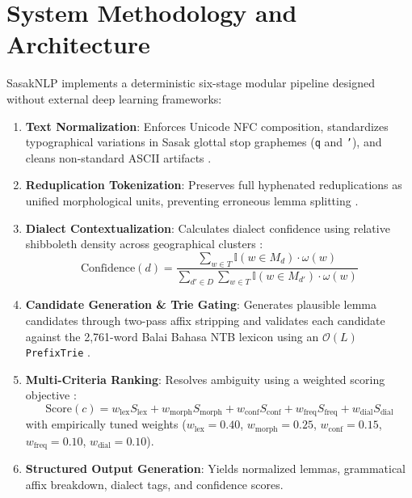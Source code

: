 \documentclass[journal,10pt]{IEEEtran}
\begin{document}
\section{System Methodology and Architecture}
SasakNLP implements a deterministic six-stage modular pipeline designed without external deep learning frameworks:
\begin{enumerate}
    \item \textbf{Text Normalization}: Enforces Unicode NFC composition, standardizes typographical variations in Sasak glottal stop graphemes (\texttt{q} and \texttt{'}), and cleans non-standard ASCII artifacts \cite{aji2022, winata2023}.
    \item \textbf{Reduplication Tokenization}: Preserves full hyphenated reduplications as unified morphological units, preventing erroneous lemma splitting \cite{abidin2024, jurafsky2024}.
    \item \textbf{Dialect Contextualization}: Calculates dialect confidence using relative shibboleth density across geographical clusters \cite{hakim2023, hakim2022}:
    \begin{equation}
        \text{Confidence}(d) = \frac{\sum_{w \in T} \mathbb{I}(w \in M_d) \cdot \omega(w)}{\sum_{d' \in D} \sum_{w \in T} \mathbb{I}(w \in M_{d'}) \cdot \omega(w)}
    \end{equation}
    \item \textbf{Candidate Generation \& Trie Gating}: Generates plausible lemma candidates through two-pass affix stripping and validates each candidate against the 2,761-word Balai Bahasa NTB lexicon using an $\mathcal{O}(L)$ \texttt{PrefixTrie} \cite{balaibahasa2022, jurafsky2024, batsuren2022}.
    \item \textbf{Multi-Criteria Ranking}: Resolves ambiguity using a weighted scoring objective \cite{jurafsky2024}:
    \begin{equation}
        \text{Score}(c) = w_{\text{lex}} S_{\text{lex}} + w_{\text{morph}} S_{\text{morph}} + w_{\text{conf}} S_{\text{conf}} + w_{\text{freq}} S_{\text{freq}} + w_{\text{dial}} S_{\text{dial}}
    \end{equation}
    with empirically tuned weights ($w_{\text{lex}}=0.40$, $w_{\text{morph}}=0.25$, $w_{\text{conf}}=0.15$, $w_{\text{freq}}=0.10$, $w_{\text{dial}}=0.10$).
    \item \textbf{Structured Output Generation}: Yields normalized lemmas, grammatical affix breakdown, dialect tags, and confidence scores.
\end{enumerate}
\end{document}
